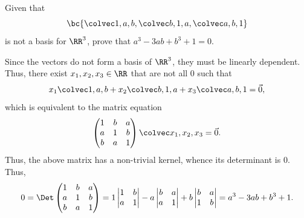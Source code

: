 \begin{problem}
    Given that \[\bc{\cveciii1ab, \cveciii{b}1a, \cveciii{a}{b}1}\] is not a basis for $\RR^3$, prove that $a^3 - 3ab + b^3 + 1 = 0$.
\end{problem}
\begin{solution}
    Since the vectors do not form a basis of $\RR^3$, they must be linearly dependent. Thus, there exist $x_1, x_2, x_3 \in \RR$ that are not all 0 such that \[x_1 \cveciii1ab + x_2 \cveciii{b}1a + x_3 \cveciii{a}{b}{1} = \vec 0,\] which is equivalent to the matrix equation \[\begin{pmatrix}1 & b & a \\ a & 1 & b \\ b & a & 1\end{pmatrix} \cveciii{x_1}{x_2}{x_3} = \vec 0.\] Thus, the above matrix has a non-trivial kernel, whence its determinant is 0. Thus, \[0 = \Det \begin{pmatrix}1 & b & a \\ a & 1 & b \\ b & a & 1\end{pmatrix} = 1 \begin{vmatrix}1 & b \\ a & 1 \end{vmatrix} - a \begin{vmatrix}b & a \\ a & 1\end{vmatrix} + b \begin{vmatrix}b & a \\ 1 & b\end{vmatrix} = a^3 - 3ab + b^3 + 1.\]
\end{solution}

